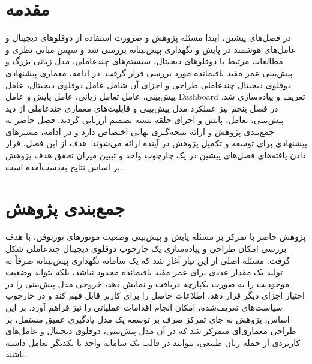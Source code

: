 \documentclass[a4paper,fleqn]{report}
\begin{document}
\section{مقدمه}
\label{sec}
در فصل‌های پیشین، ابتدا مسئله پژوهش و ضرورت استفاده از دوقلوهای دیجیتال و عامل‌های هوشمند در پایش و نگهداری پیش‌بینانه بررسی شد و سپس مبانی نظری و مطالعات مرتبط با دوقلوهای دیجیتال، سیستم‌های چندعاملی، مدل زبانی بزرگ و پیش‌بینی عمر مفید باقیمانده مورد بررسی قرار گرفت. در ادامه، معماری پیشنهادی دوقلوی دیجیتال چندعاملی طراحی و اجزای آن شامل عامل دوقلوی دیجیتال، عامل پیش‌بینی، عامل تعامل زبانی، عامل پایش و عامل \gls{Dashboard} تعریف و پیاده‌سازی شد. در فصل پنجم نیز عملکرد مدل پیش‌بینی و قابلیت‌های معماری چندعاملی از دید پیش‌بینی، تعامل، پایش و اجرای حلقه بسته تصمیم ارزیابی گردید. فصل حاضر به جمع‌بندی پژوهش و ارائه نتیجه‌گیری نهایی اختصاص دارد و در ادامه، مسیرهای پیشنهادی برای توسعه و تکمیل پژوهش در آینده ارائه می‌شوند. هدف از این فصل، قرار دادن یافته‌های فصل‌های پیشین در یک چارچوب واحد و تبیین میزان تحقق هدف پژوهش بر اساس نتایج به‌دست‌آمده است.

\section{جمع‌بندی پژوهش}
\label{sec:research-summary}
پژوهش حاضر با تمرکز بر مسئله پایش و پیش‌بینی وضعیت موتورهای توربوفن، با هدف بررسی امکان طراحی و پیاده‌سازی یک چارچوب دوقلوی دیجیتال چندعاملی شکل گرفت. مسئله اصلی از این نیاز آغاز شد که یک سامانه نگهداری پیش‌بینانه صرفاً به تولید یک مقدار عددی برای عمر مفید باقیمانده محدود نباشد، بلکه بتواند وضعیت موجودیت را به صورت یکپارچه دریافت و نمایش دهد، خروجی مدل پیش‌بینی را در اختیار اجزای دیگر قرار دهد، اطلاعات حاصل را برای کاربر قابل فهم کند و در چارچوب سیاست‌های تعریف‌شده، امکان انجام اقدامات عملیاتی را نیز فراهم آورد. بر این اساس، پژوهش به جای تمرکز صرف بر توسعه یک مدل یادگیری عمیق مستقل، بر طراحی معماری‌ای متمرکز شد که در آن مدل پیش‌بینی، دوقلوی دیجیتال و عامل‌های کاربردی از جمله زبان طبیعی، بتوانند در قالب یک سامانه واحد با یکدیگر تعامل داشته باشند.
\end{document}
